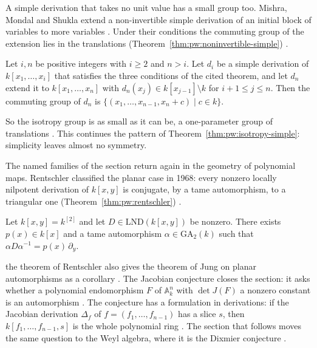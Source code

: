 A simple derivation that takes no unit value has a small group too.
Mishra, Mondal and Shukla extend a non-invertible simple derivation of an
initial block of variables to more variables
\cite[p.~1]{MishraMondalShukla2025Simple}. Under their conditions the
commuting group of the extension lies in the translations (Theorem~\ref{thm:pw:noninvertible-simple})
\cite[Theorem~2.4, p.~5]{MishraMondalShukla2025Simple}.\begin{theorem}\label{thm:pw:noninvertible-simple}
Let $i,n$ be positive integers with $i\geq 2$ and $n>i$. Let $d_{i}$ be a
simple derivation of $k[x_{1},\dots,x_{i}]$ that satisfies the three
conditions of the cited theorem, and let $d_{n}$ extend it to
$k[x_{1},\dots,x_{n}]$ with $d_{n}(x_{j})\in k[x_{j-1}]\setminus k$ for
$i+1\leq j\leq n$. Then the commuting group of $d_{n}$ is
$\{(x_{1},\dots,x_{n-1},x_{n}+c)\mid c\in k\}$.
\end{theorem}

So the isotropy group is as small as it can be, a one-parameter group of
translations \cite[p.~1]{MishraMondalShukla2025Simple}. This continues the
pattern of Theorem~\ref{thm:pw:isotropy-simple}: simplicity leaves almost no
symmetry.

The named families of the section return again in the geometry of
polynomial maps. Rentschler classified the planar case in 1968: every
nonzero locally nilpotent derivation of $k[x,y]$ is conjugate, by a tame
automorphism, to a triangular one (Theorem~\ref{thm:pw:rentschler}) \cite[Theorem~4.1, p.~113]{Freudenburg2017}.

\begin{theorem}\label{thm:pw:rentschler}
Let $k[x,y]=k^{[2]}$ and let $D\in\mathrm{LND}(k[x,y])$ be nonzero. There
exists $p(x)\in k[x]$ and a tame automorphism $\alpha\in\mathrm{GA}_{2}(k)$
such that $\alpha D\alpha^{-1}=p(x)\,\partial_{y}$.
\end{theorem}

the theorem of Rentschler also gives the theorem of Jung on planar automorphisms as
a corollary \cite[p.~113]{Freudenburg2017}. The Jacobian conjecture closes
the section: it asks whether a polynomial endomorphism $F$ of
$\mathbb{A}^{n}_{k}$ with $\det J(F)$ a nonzero constant is an automorphism
\cite[p.~1]{BelovKanelKontsevich2007}. The conjecture has a formulation in
derivations: if the Jacobian derivation $\Delta_{f}$ of
$f=(f_{1},\dots,f_{n-1})$ has a slice $s$, then $k[f_{1},\dots,f_{n-1},s]$
is the whole polynomial ring \cite[p.~81]{Freudenburg2017}. The section
that follows moves the same question to the Weyl algebra, where it is the
Dixmier conjecture \cite[p.~241]{Dixmier1968}.

